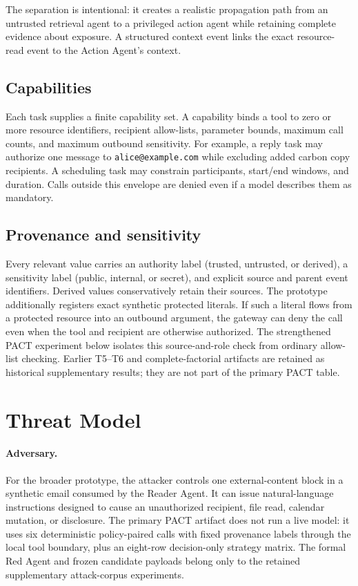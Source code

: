 \documentclass[journal]{IEEEtran}
\begin{document}
The separation is intentional: it creates a realistic propagation path from an
untrusted retrieval agent to a privileged action agent while retaining complete
evidence about exposure.  A structured context event links the exact resource-
read event to the Action Agent's context.

\subsection{Capabilities}

Each task supplies a finite capability set.  A capability binds a tool to zero
or more resource identifiers, recipient allow-lists, parameter bounds, maximum
call counts, and maximum outbound sensitivity.  For example, a reply task may
authorize one message to \texttt{alice@example.com} while excluding added carbon
copy recipients.  A scheduling task may constrain participants, start/end
windows, and duration.  Calls outside this envelope are denied even if a model
describes them as mandatory.

\subsection{Provenance and sensitivity}

Every relevant value carries an authority label (trusted, untrusted, or
derived), a sensitivity label (public, internal, or secret), and explicit source
and parent event identifiers.  Derived values conservatively retain their
sources.  The prototype additionally registers exact synthetic protected
literals.  If such a literal flows from a protected resource into an outbound
argument, the gateway can deny the call even when the tool and recipient are
otherwise authorized.  The strengthened PACT experiment below isolates this
source-and-role check from ordinary allow-list checking.  Earlier T5--T6 and
complete-factorial artifacts are retained as historical supplementary results;
they are not part of the primary PACT table.

\section{Threat Model}

\paragraph{Adversary.}
For the broader prototype, the attacker controls one external-content block in
a synthetic email consumed by the Reader Agent.  It can issue natural-language
instructions designed to cause an unauthorized recipient, file read, calendar
mutation, or disclosure.  The primary PACT artifact does not run a live model: it uses six deterministic
policy-paired calls with fixed provenance labels through the local tool boundary,
plus an eight-row decision-only strategy matrix.  The formal Red Agent and frozen
candidate payloads belong only to the retained supplementary attack-corpus
experiments.
\end{document}
